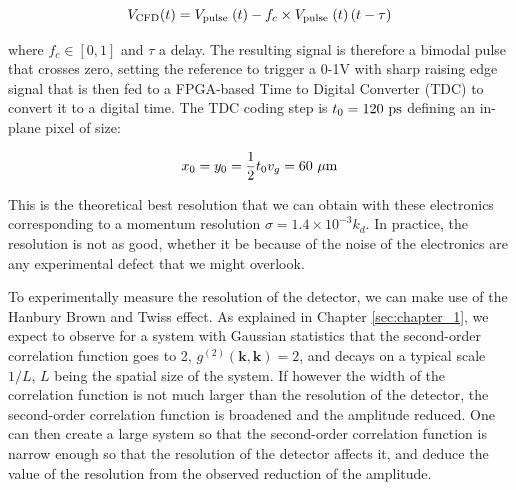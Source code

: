 \begin{equation}
    V_{\rm{CFD}}(t)=V_{\text {pulse }}(t)-f_{c} \times V_{\text {pulse }}(t)\left(t-\tau\right)
\end{equation}

\noindent where $f_c \in [0,1]$ and $\tau$ a delay. The resulting signal is therefore a bimodal pulse that crosses zero, setting the reference to trigger a 0-1V with sharp raising edge signal that is then fed to a FPGA-based Time to Digital Converter (TDC) to convert it to a digital time. The TDC coding step is $t_0 = 120 \ \rm{ps}$ defining an in-plane pixel of size:

\begin{equation}
    x_0 = y_0 = \frac{1}{2} t_0 v_g = 60 \ \mu \rm{m}
\end{equation}

 \noindent This is the theoretical best resolution that we can obtain with these electronics corresponding to a momentum resolution $\sigma = 1.4 \times 10^{-3} k_d$. In practice, the resolution is not as good, whether it be because of the noise of the electronics are any experimental defect that we might overlook.
 
 To experimentally measure the resolution of the detector, we can make use of the Hanbury Brown and Twiss effect. As explained in Chapter \ref{sec:chapter_1}, we expect to observe for a system with Gaussian statistics that the second-order correlation function goes to 2, $g^{(2)} (\bm{k},\bm{k})=2$, and decays on a typical scale $1/L$, $L$ being the spatial size of the system. If however the width of the correlation function is not much larger than the resolution of the detector, the second-order correlation function is broadened and the amplitude reduced. One can then create a large system so that the second-order correlation function is narrow enough so that the resolution of the detector affects it, and deduce the value of the resolution from the observed reduction of the amplitude.
 
